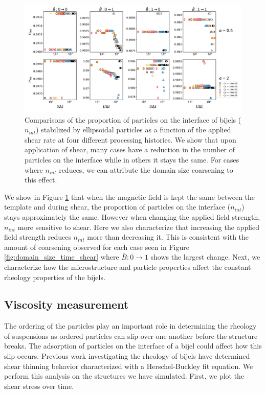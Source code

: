 \begin{figure} 
    \centering 
    \includegraphics[scale=0.3]{../figures/results/paper3/n_int-time_compare.png} 
    \caption{Comparisons of the proportion of particles on the interface of bijels ($n_{int}$) stabilized by ellipsoidal particles as a function of 
             the applied shear rate at four different processing histories. We show that upon application of shear, many cases have a 
             reduction in the number of particles on the interface while in others it stays the same. For cases where $n_{int}$ reduces, we can 
             attribute the domain size coarsening to this effect.} 
    \label{fig:particles_interface_prop_shear} 
\end{figure}

We show in Figure \ref{fig:particles_interface_prop_shear} that when the magnetic field is kept the same between the template and during shear, the
proportion of particles on the interface ($n_{int}$) stays approximately the same. However when changing the applied field strength, $n_{int}$ more 
sensitive to shear. Here we also characterize that increasing the applied field strength reduces $n_{int}$ more than decreasing it. This is consistent
with the amount of coarsening observed for each case seen in Figure \ref{fig:domain_size_time_shear} where $\bar{B}:0 \rightarrow 1$ shows the largest
change. Next, we characterize how the microstructure and particle properties affect the constant rheology properties of the bijels.

\subsection{Viscosity measurement}

The ordering of the particles play an important role in determining the rheology of suspensions as ordered particles can slip over one another
before the structure breaks. The adsorption of particles on the interface of a bijel could affect how this slip occurs. Previous work investigating
the rheology of bijels have determined shear thinning behavior characterized with a Herschel-Buckley fit equation. We perform this analysis on the
structures we have simulated. First, we plot the shear stress over time.

